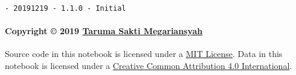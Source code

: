 \documentclass[11pt]{article}
\begin{document}
\begin{verbatim}
- 20191219 - 1.1.0 - Initial
\end{verbatim}

\hypertarget{copyright-2019-taruma-sakti-megariansyah}{%
\paragraph{\texorpdfstring{Copyright © 2019
\href{https://taruma.github.io}{Taruma Sakti
Megariansyah}}{Copyright © 2019 Taruma Sakti Megariansyah}}\label{copyright-2019-taruma-sakti-megariansyah}}

Source code in this notebook is licensed under a
\href{https://choosealicense.com/licenses/mit/}{MIT License}. Data in
this notebook is licensed under a
\href{https://creativecommons.org/licenses/by/4.0/}{Creative Common
Attribution 4.0 International}.


    
    
    
\end{document}
